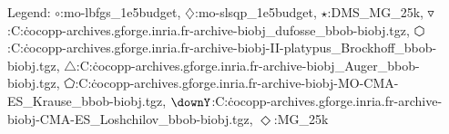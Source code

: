 Legend: {\color{NavyBlue}$\circ$}:mo-lbfgs\_1e5budget, {\color{Magenta}$\diamondsuit$}:mo-slsqp\_1e5budget, {\color{Orange}$\star$}:DMS\_MG\DMS\_25k, {\color{CornflowerBlue}$\triangledown$}:C:\Users\dimo\.cocopp\data-archives\coco.gforge.inria.fr\data-archive\bbob-biobj\_dufosse\_bbob-biobj.tgz, {\color{red}$\varhexagon$}:C:\Users\dimo\.cocopp\data-archives\coco.gforge.inria.fr\data-archive\bbob-biobj\NSGA-II-platypus\_Brockhoff\_bbob-biobj.tgz, {\color{YellowGreen}$\triangle$}:C:\Users\dimo\.cocopp\data-archives\coco.gforge.inria.fr\data-archive\bbob-biobj\_Auger\_bbob-biobj.tgz, {\color{cyan}$\pentagon$}:C:\Users\dimo\.cocopp\data-archives\coco.gforge.inria.fr\data-archive\bbob-biobj\UP-MO-CMA-ES\_Krause\_bbob-biobj.tgz, {\color{ForestGreen}$\downY$}:C:\Users\dimo\.cocopp\data-archives\coco.gforge.inria.fr\data-archive\bbob-biobj\HMO-CMA-ES\_Loshchilov\_bbob-biobj.tgz, {\color{Lavender}$\Diamond$}:MG\_25k
